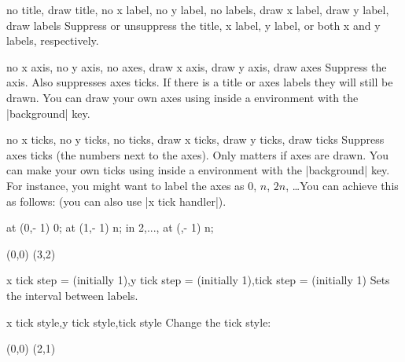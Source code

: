\begin{sseqdata}[|| name = ex1, cohomological Serre grading]
\begin{keylist}{no title, draw title, no x label, no y label, no labels, draw x label, draw y label, draw labels}
Suppress or unsuppress the title, x label, y label, or both x and y labels, respectively.
\end{keylist}

\begin{keylist}{no x axis, no y axis, no axes, draw x axis, draw y axis, draw axes}
Suppress the axis. Also suppresses axes ticks. If there is a title or axes labels they will still be drawn. You can draw your own axes using \tikzpkg\space inside a \scopeenv\space environment with the |background| key.
\end{keylist}

\begin{keylist}{no x ticks, no y ticks, no ticks, draw x ticks, draw y ticks, draw ticks}
Suppress axes ticks (the numbers next to the axes). Only matters if axes are drawn. You can make your own ticks using \tikzpkg\space inside a \scopeenv\space environment with the |background| key. For instance, you might want to label the axes as 0, $n$, $2n$, \ldots You can achieve this as follows: (you can also use |x tick handler|).
\begin{codeexample}[width = 5.7cm]
\begin{sseqpage}[ no x ticks, x range = {0}{3} ]
\begin{scope}[ background ]
    \node at (0,\ymin - 1) {0};
    \node at (1,\ymin - 1) {\protect\vphantom{2}n};
\foreach \n in {2,..., \xmax}{
    \node at (\n,\ymin - 1) {\n n};
}
\end{scope}
\class(0,0)
\class(3,2)
\end{sseqpage}
\end{codeexample}
\end{keylist}

\begin{keylist}{x tick step =  (initially 1),y tick step =  (initially 1),tick step =  (initially 1)}
Sets the interval between labels.
\end{keylist}

\begin{stylekeylist}{x tick style,y tick style,tick style}
Change the tick style:
\begin{codeexample}[width = 7cm]
\begin{sseqpage}[ tick style = { blue, font = \tiny } ]
\class(0,0) \class(2,1)
\end{sseqpage}
\end{codeexample}
\end{stylekeylist}


\end{sseqdata}

